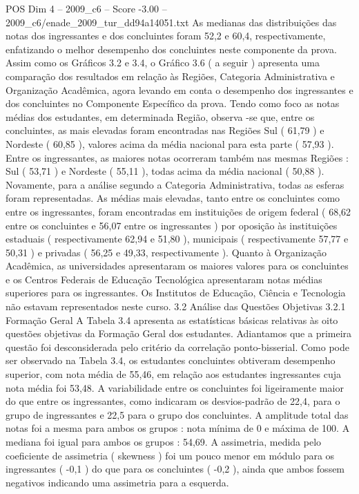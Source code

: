 \begin{textsample}{POS Dim 4 – 2009\_c6 – Score -3.00 – 2009\_c6/enade\_2009\_tur\_dd94a14051.txt}
As medianas das distribuições das notas dos ingressantes e dos concluintes foram 52,2 e 60,4, respectivamente, enfatizando o melhor desempenho dos concluintes neste componente da prova.
Assim como os Gráficos 3.2 e 3.4, o Gráfico 3.6 ( a seguir ) apresenta uma comparação dos resultados em relação às Regiões, Categoria Administrativa e Organização Acadêmica, agora levando em conta o desempenho dos ingressantes e dos concluintes no Componente Específico da prova.
Tendo como foco as notas médias dos estudantes, em determinada Região, observa -se que, entre os concluintes, as mais elevadas foram encontradas nas Regiões Sul ( 61,79 ) e Nordeste ( 60,85 ), valores acima da média nacional para esta parte ( 57,93 ).
Entre os ingressantes, as maiores notas ocorreram também nas mesmas Regiões : Sul ( 53,71 ) e Nordeste ( 55,11 ), todas acima da média nacional ( 50,88 ).
Novamente, para a análise segundo a Categoria Administrativa, todas as esferas foram representadas.
As médias mais elevadas, tanto entre os concluintes como entre os ingressantes, foram encontradas em instituições de origem federal ( 68,62 entre os concluintes e 56,07 entre os ingressantes ) por oposição às instituições estaduais ( respectivamente 62,94 e 51,80 ), municipais ( respectivamente 57,77 e 50,31 ) e privadas ( 56,25 e 49,33, respectivamente ).
Quanto à Organização Acadêmica, as universidades apresentaram os maiores valores para os concluintes e os Centros Federais de Educação Tecnológica apresentaram notas médias superiores para os ingressantes.
Os Institutos de Educação, Ciência e Tecnologia não estavam representados neste curso. 3.2 Análise das Questões Objetivas 3.2.1 Formação Geral A Tabela 3.4 apresenta as estatísticas básicas relativas às oito questões objetivas da Formação Geral dos estudantes.
Adiantamos que a primeira questão foi desconsiderada pelo critério da correlação ponto-bisserial.
Como pode ser observado na Tabela 3.4, os estudantes concluintes obtiveram desempenho superior, com nota média de 55,46, em relação aos estudantes ingressantes cuja nota média foi 53,48.
A variabilidade entre os concluintes foi ligeiramente maior do que entre os ingressantes, como indicaram os desvios-padrão de 22,4, para o grupo de ingressantes e 22,5 para o grupo dos concluintes.
A amplitude total das notas foi a mesma para ambos os grupos : nota mínima de 0 e máxima de 100.
A mediana foi igual para ambos os grupos : 54,69.
A assimetria, medida pelo coeficiente de assimetria ( skewness ) foi um pouco menor em módulo para os ingressantes ( -0,1 ) do que para os concluintes ( -0,2 ), ainda que ambos fossem negativos indicando uma assimetria para a esquerda.

\end{textsample}
